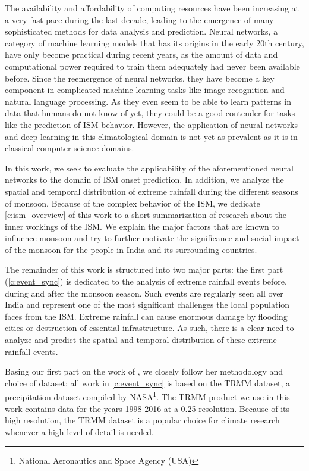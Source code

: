 The availability and affordability of computing resources have been increasing at a very fast pace during the last decade, leading to the emergence of many sophisticated methods for data analysis and prediction. Neural networks, a category of machine learning models that has its origins in the early 20th century, have only become practical during recent years, as the amount of data and computational power required to train them adequately had never been available before. Since the reemergence of neural networks, they have become a key component in complicated machine learning tasks like image recognition and natural language processing. As they even seem to be able to learn patterns in data that humans do not know of yet, they could be a good contender for tasks like the prediction of ISM behavior. However, the application of neural networks and deep learning in this climatological domain is not yet as prevalent as it is in classical computer science domains.

In this work, we seek to evaluate the applicability of the aforementioned neural networks to the domain of ISM onset prediction. In addition, we analyze the spatial and temporal distribution of extreme rainfall during the different seasons of monsoon. Because of the complex behavior of the ISM, we dedicate \cref{c:ism_overview} of this work to a short summarization of research about the inner workings of the ISM. We explain the major factors that are known to influence monsoon and try to further motivate the significance and social impact of the monsoon for the people in India and its surrounding countries.

The remainder of this work is structured into two major parts: the first part (\cref{c:event_sync}) is dedicated to the analysis of extreme rainfall events before, during and after the monsoon season. Such events are regularly seen all over India and represent one of the most significant challenges the local population faces from the ISM. Extreme rainfall can cause enormous damage by flooding cities or destruction of essential infrastructure. As such, there is a clear need to analyze and predict the spatial and temporal distribution of these extreme rainfall events.

Basing our first part on the work of \citet{Stolbova.2015}, we closely follow her methodology and choice of dataset: all work in \cref{c:event_sync} is based on the TRMM dataset, a precipitation dataset compiled by NASA\footnote{National Aeronautics and Space Agency (USA)}. The TRMM product we use in this work contains data for the years 1998-2016 at a {0.25\degree} resolution. Because of its high resolution, the TRMM dataset is a popular choice for climate research whenever a high level of detail is needed.

